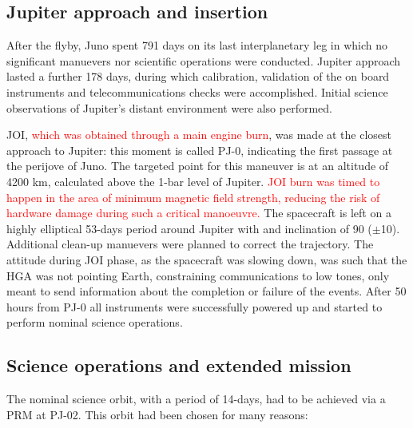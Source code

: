 \subsection{Jupiter approach and insertion}
\label{sec: joi}

After the flyby, Juno spent 791 days on its last interplanetary leg in which no significant manuevers nor scientific operations were conducted. Jupiter approach lasted a further 178 days, during which calibration, validation of the on board instruments and telecommunications checks were accomplished. Initial science observations of Jupiter's distant environment were also performed. 


JOI, \textcolor{red}{which was obtained through a main engine burn}, was made at the closest approach to Jupiter: this moment is called PJ-0, indicating the first passage at the perijove of Juno. The targeted point for this maneuver is at an altitude of 4200 km, calculated above the 1-bar level of Jupiter. 
\textcolor{red}{JOI burn was timed to happen in the area of minimum magnetic field strength, reducing the risk of hardware damage during such a critical manoeuvre.} The spacecraft is left on a highly elliptical 53-days period around Jupiter with and inclination of 90\textdegree \; ($\pm$10\textdegree). Additional clean-up manuevers were planned to correct the trajectory. The attitude during JOI phase, as the spacecraft was slowing down, was such that the HGA was not pointing Earth, constraining communications to low tones, only meant to send information about the completion or failure of the events. 
After 50 hours from PJ-0 all instruments were successfully powered up and started to perform nominal science operations.

\subsection{Science operations and extended mission}
\label{sec: science ops}


The nominal science orbit, with a period of 14-days, had to be achieved via a PRM at PJ-02.  This orbit had been chosen for many reasons: 

